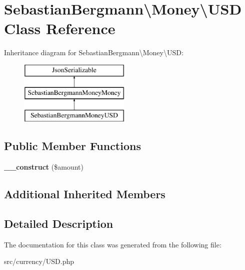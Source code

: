 \hypertarget{classSebastianBergmann_1_1Money_1_1USD}{}\section{Sebastian\+Bergmann\textbackslash{}Money\textbackslash{}U\+S\+D Class Reference}
\label{classSebastianBergmann_1_1Money_1_1USD}
Inheritance diagram for Sebastian\+Bergmann\textbackslash{}Money\textbackslash{}U\+S\+D\+:\begin{figure}[H]
\begin{center}
\leavevmode
\includegraphics[height=3.000000cm]{classSebastianBergmann_1_1Money_1_1USD}
\end{center}
\end{figure}
\subsection*{Public Member Functions}
\begin{DoxyCompactItemize}
\item 
\hypertarget{classSebastianBergmann_1_1Money_1_1USD_ad14570e03fafeb907b053b2ac45d70bb}{}{\bfseries \+\_\+\+\_\+construct} (\$amount)\label{classSebastianBergmann_1_1Money_1_1USD_ad14570e03fafeb907b053b2ac45d70bb}

\end{DoxyCompactItemize}
\subsection*{Additional Inherited Members}


\subsection{Detailed Description}


The documentation for this class was generated from the following file\+:\begin{DoxyCompactItemize}
\item 
src/currency/U\+S\+D.\+php\end{DoxyCompactItemize}
